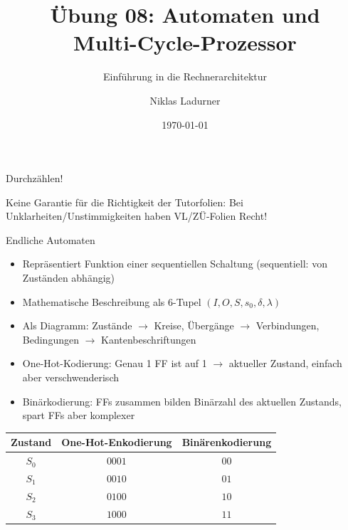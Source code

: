 \documentclass[
  german,            %
  aspectratio=169,    %
]{tumbeamer}
\title{Übung 08: Automaten und \\Multi-Cycle-Prozessor}
\subtitle{Einführung in die Rechnerarchitektur}
\author{Niklas Ladurner}
\institute{\theChairName\\\theDepartmentName\\\theUniversityName}
\date[\today]{\today}
\begin{document}
\maketitle

\begin{frame}[c]{}{}
  \begin{center}
    \LARGE  Durchzählen!
  \end{center}
\end{frame}

\begin{frame}[c]{}{}
  \begin{center}
    \LARGE  Keine Garantie für die Richtigkeit der Tutorfolien: Bei Unklarheiten/Unstimmigkeiten
    haben VL/ZÜ-Folien Recht!
  \end{center}
\end{frame}

\begin{frame}[fragile, c]{Endliche Automaten}{}
  \begin{itemize}
    \item Repräsentiert Funktion einer sequentiellen Schaltung (sequentiell: von Zuständen abhängig)
    \item Mathematische Beschreibung als 6-Tupel $(I, O, S, s_0, \delta, \lambda)$
    \item Als Diagramm: Zustände $\rightarrow$ Kreise, Übergänge $\rightarrow$ Verbindungen, Bedingungen $\rightarrow$ Kantenbeschriftungen
    \item One-Hot-Kodierung: Genau 1 FF ist auf 1 $\rightarrow$ aktueller Zustand, einfach aber verschwenderisch
    \item Binärkodierung: FFs zusammen bilden Binärzahl des aktuellen Zustands, spart FFs aber komplexer
  \end{itemize}
  \begin{table}[]
    \begin{tabular}{c|c|c}
    Zustand & One-Hot-Enkodierung & Binärenkodierung \\ \hline
    $S_0$    & $0001$                & $00$               \\
    $S_1$    & $0010$                & $01$               \\
    $S_2$    & $0100$                & $10$               \\
    $S_3$    & $1000$                & $11$              
    \end{tabular}
    \end{table}
\end{frame}
\end{document}
